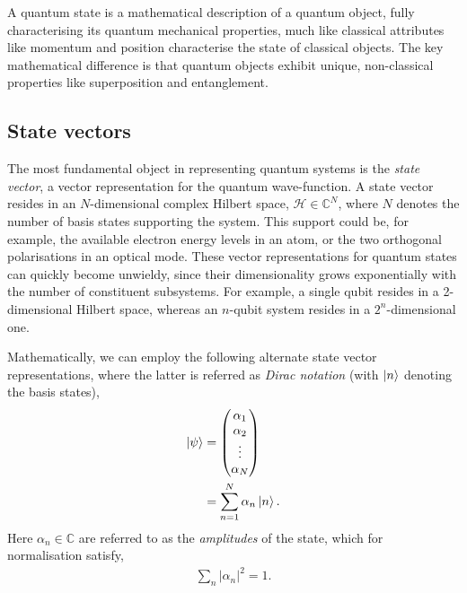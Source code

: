 \documentclass[aps,pra,twocolumn,amsmath,amssymb,nofootinbib,superscriptaddress]{revtex4}
\newcommand{\dropcap}[2]{\lettrine[lines=2, findent=3pt, nindent=0pt]{#1}{#2}}
\begin{document}
\dropcap{A}{} quantum state is a mathematical description of a quantum object, fully characterising its quantum mechanical properties, much like classical attributes like momentum and position characterise the state of classical objects. The key mathematical difference is that quantum objects exhibit unique, non-classical properties like superposition and entanglement.

%
%

\subsection{State vectors}

The most fundamental object in representing quantum systems is the \textit{state vector}, a vector representation for the quantum wave-function. A state vector resides in an $N$-dimensional complex Hilbert space, \mbox{$\mathcal{H}\in\mathbb{C}^N$}, where $N$ denotes the number of basis states supporting the system. This support could be, for example, the available electron energy levels in an atom, or the two orthogonal polarisations in an optical mode. These vector representations for quantum states can quickly become unwieldy, since their dimensionality grows exponentially with the number of constituent subsystems. For example, a single qubit resides in a 2-dimensional Hilbert space, whereas an $n$-qubit system resides in a $2^n$-dimensional one.

Mathematically, we can employ the following alternate state vector representations, where the latter is referred as \textit{Dirac notation} (with $\ket{n}$ denoting the basis states),
\begin{align}\label{eq:gen_state_vec}
	\ket\psi &= \left(\begin{matrix}{}
	\alpha_1\\
	\alpha_2\\
	\vdots\\
	\alpha_N
\end{matrix}\right)\nonumber\\
	&= \sum_{n=1}^N \alpha_n \ket{n}.
\end{align}
Here \mbox{$\alpha_n\in\mathbb{C}$} are referred to as the \textit{amplitudes} of the state, which for normalisation satisfy,
\begin{align}\label{eq:state_norm_cond}
\sum_n |\alpha_n|^2 = 1.
\end{align}
\end{document}
